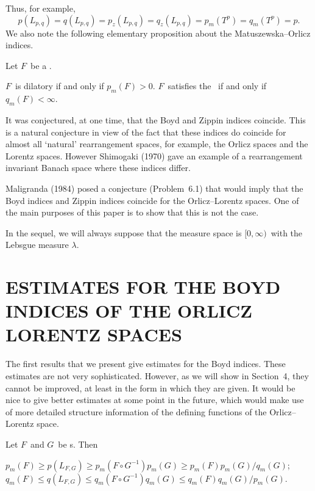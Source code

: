 Thus, for example, 
$$ p(L_{p,q}) = q(L_{p,q}) = p_z(L_{p,q}) = q_z(L_{p,q})
   = p_m(T^p) = q_m(T^p) = p .$$
We also note the following elementary proposition about the 
Matuszewska--Orlicz
indices.

\begin{prop} Let $F$\ be a \phifunction. 
\begin{itemrom}
\itemi $F$\ is dilatory if and only if $p_m(F) > 0$.
\itemii $F$\ satisfies the \Deltacond\ if and only if $q_m(F) < \infty$.
\end{itemrom}
\end{prop}

It was conjectured, at one time, that the Boyd and Zippin indices coincide.
This is a natural conjecture in view of the fact that these indices do 
coincide
for almost all `natural' rearrangement spaces, for example, the Orlicz spaces
and the Lorentz spaces. However
Shimogaki (1970) gave an example of a rearrangement invariant Banach space
where these indices differ.

Maligranda (1984) posed a conjecture (Problem~6.1)
that would imply that the Boyd indices and Zippin indices coincide for the
Orlicz--Lorentz spaces. One of the main purposes of this paper is to show 
that
this is not the case.

In the sequel, we will always suppose that the measure space is $[0,\infty)$\
with the Lebsgue measure $\lambda$.

\section{ESTIMATES FOR THE BOYD INDICES OF THE ORLICZ LORENTZ SPACES}

The first results that we present give estimates for the Boyd indices. These
estimates are not very sophisticated. However, as we will show in Section~4,
they cannot be improved, at least in the form in which they are given. 
It would
be nice to give better estimates at some point in the future, which would 
make
use of more detailed structure information of the  defining functions of the
Orlicz--Lorentz space.

\begin{thm} Let $F$\ and $G$\ be \phifunction s. Then
\begin{itemrom}
\itemi
$ p_m(F) \ge p(L_{F,G}) \ge p_m(F\circ G^{-1}) p_m(G) \ge
p_m(F) p_m(G)/q_m(G)$; 
\itemii
$ q_m(F) \le q(L_{F,G}) \le q_m(F\circ G^{-1}) q_m(G) \le 
q_m(F) q_m(G)/p_m(G)$.
\end{itemrom}
\end{thm}

